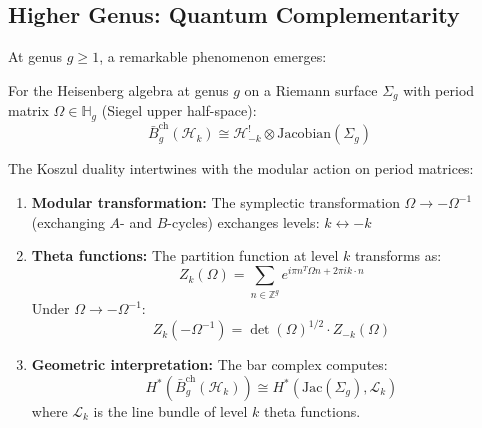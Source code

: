 \subsection{Higher Genus: Quantum Complementarity}

At genus $g \geq 1$, a remarkable phenomenon emerges:

\begin{theorem}\label{thm:heisenberg-genus-g}
For the Heisenberg algebra at genus $g$ on a Riemann surface $\Sigma_g$ with period matrix $\Omega \in \mathbb{H}_g$ (Siegel upper half-space):
$$\bar{B}^{\text{ch}}_g(\mathcal{H}_k) \cong \mathcal{H}_{-k}^! \otimes \text{Jacobian}(\Sigma_g)$$

The Koszul duality intertwines with the modular action on period matrices:
\begin{enumerate}
\item \textbf{Modular transformation:} The symplectic transformation $\Omega \to -\Omega^{-1}$ (exchanging $A$- and $B$-cycles) exchanges levels: $k \leftrightarrow -k$

\item \textbf{Theta functions:} The partition function at level $k$ transforms as:
$$Z_k(\Omega) = \sum_{n \in \mathbb{Z}^g} e^{i\pi n^T \Omega n + 2\pi i k \cdot n}$$
Under $\Omega \to -\Omega^{-1}$:
$$Z_k(-\Omega^{-1}) = \det(\Omega)^{1/2} \cdot Z_{-k}(\Omega)$$

\item \textbf{Geometric interpretation:} The bar complex computes:
$$H^*(\bar{B}_g^{\text{ch}}(\mathcal{H}_k)) \cong H^*(\text{Jac}(\Sigma_g), \mathcal{L}_k)$$
where $\mathcal{L}_k$ is the line bundle of level $k$ theta functions.
\end{enumerate}
\end{theorem}


